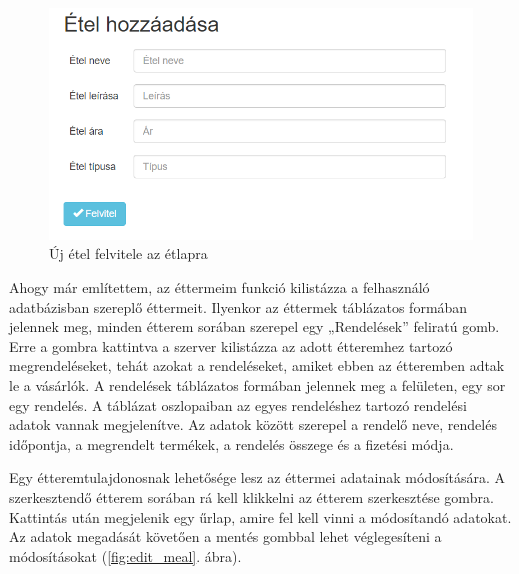 \begin{figure}
\centering
\includegraphics[scale=0.8]{kepek/add_meal.png}
\caption{Új étel felvitele az étlapra}
\label{fig:add_meal}
\end{figure}


Ahogy már említettem, az éttermeim funkció kilistázza a felhasználó adatbázisban szereplő éttermeit. Ilyenkor az éttermek táblázatos formában jelennek meg, minden étterem sorában szerepel egy „Rendelések” feliratú gomb. Erre a gombra kattintva a szerver kilistázza az adott étteremhez tartozó megrendeléseket, tehát azokat a rendeléseket, amiket ebben az étteremben adtak le a vásárlók. A rendelések táblázatos formában jelennek meg a felületen, egy sor egy rendelés. A táblázat oszlopaiban az egyes rendeléshez tartozó rendelési adatok vannak megjelenítve. Az adatok között szerepel a rendelő neve, rendelés időpontja, a megrendelt termékek, a rendelés összege és a fizetési módja.


Egy étteremtulajdonosnak lehetősége lesz az éttermei adatainak módosítására. A szerkesztendő étterem sorában rá kell klikkelni az étterem szerkesztése gombra. Kattintás után megjelenik egy űrlap, amire fel kell vinni a módosítandó adatokat. Az adatok megadását követően a mentés gombbal lehet véglegesíteni a módosításokat (\ref{fig:edit_meal}. ábra).

